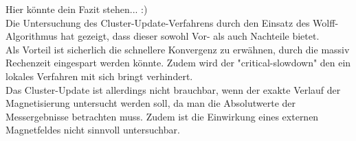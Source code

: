 Hier könnte dein Fazit stehen... :)\\
Die Untersuchung des Cluster-Update-Verfahrens durch den Einsatz des Wolff-Algorithmus hat gezeigt, dass dieser sowohl Vor- als auch Nachteile bietet.\\
Als Vorteil ist sicherlich die schnellere Konvergenz zu erwähnen, durch die massiv Rechenzeit eingespart werden könnte. Zudem wird der "critical-slowdown" den ein lokales Verfahren mit sich bringt verhindert.\\
Das Cluster-Update ist allerdings nicht brauchbar, wenn der exakte Verlauf der Magnetisierung untersucht werden soll, da man die Absolutwerte der Messergebnisse betrachten muss. Zudem ist die Einwirkung eines externen Magnetfeldes nicht sinnvoll untersuchbar.
 
